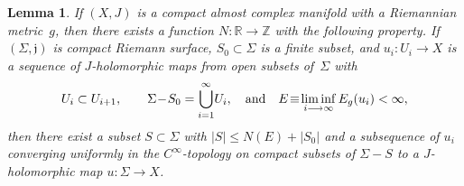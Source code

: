 \documentclass[11pt]{article}
\numberwithin{equation}{section}
\newtheorem{lmm}[thm]{Lemma}
\theoremstyle{definition}
\def\BE#1{\begin{equation}\label{#1}}
\def\EE{\end{equation}}
\def\lra{\longrightarrow}
\def\fj{\mathfrak j}
\def\R{\mathbb R}
\def\Z{{\mathbb Z}}
\def\Si{\Sigma}
\def\i{\infty}
\begin{document}
\begin{lmm}\label{EnerPres3_lmm}
If $(X,J)$ is a compact almost complex manifold with a Riemannian metric~$g$,
then there exists a function $N\!:\R\!\lra\!\Z$ with the following property.
If $(\Si,\fj)$ is compact Riemann surface, $S_0\!\subset\!\Si$ is a finite subset,
 and $u_i\!:U_i\!\lra\!X$ is a sequence of $J$-holomorphic maps 
from open subsets of~$\Si$ with 
\BE{EnerPres3_e}U_i\subset U_{i+1}, \qquad \Si\!-\!S_0=\bigcup_{i=1}^{\i}\!U_i,
\quad\hbox{and}\quad E\!\equiv\!\liminf_{i\lra\i}E_g(u_i)<\i,\EE
then there exist a subset $S\!\subset\!\Si$ with $|S|\!\le\!N(E)\!+\!|S_0|$ 
and a subsequence of $u_i$ converging  uniformly in the $C^{\i}$-topology 
on compact subsets of $\Si\!-\!S$
to a $J$-holomorphic map $u\!:\Si\!\lra\!X$.
\end{lmm}
\end{document}
